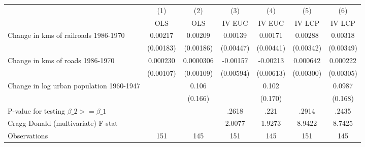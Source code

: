 {
\def\sym#1{\ifmmode^{#1}\else\(^{#1}\)\fi}
\begin{tabular}{l*{6}{c}}
\hline\hline
                &\multicolumn{1}{c}{(1)}&\multicolumn{1}{c}{(2)}&\multicolumn{1}{c}{(3)}&\multicolumn{1}{c}{(4)}&\multicolumn{1}{c}{(5)}&\multicolumn{1}{c}{(6)}\\
                &\multicolumn{1}{c}{OLS}&\multicolumn{1}{c}{OLS}&\multicolumn{1}{c}{IV EUC}&\multicolumn{1}{c}{IV EUC}&\multicolumn{1}{c}{IV LCP}&\multicolumn{1}{c}{IV LCP}\\
\hline
Change in kms of railroads 1986-1970&  0.00217         &  0.00209         &  0.00139         &  0.00171         &  0.00288         &  0.00318         \\
                &(0.00183)         &(0.00186)         &(0.00447)         &(0.00441)         &(0.00342)         &(0.00349)         \\
[1em]
Change in kms of roads 1986-1970& 0.000230         &0.0000306         & -0.00157         & -0.00213         & 0.000642         & 0.000222         \\
                &(0.00107)         &(0.00109)         &(0.00594)         &(0.00613)         &(0.00300)         &(0.00305)         \\
[1em]
Change in log urban population 1960-1947&                  &    0.106         &                  &    0.102         &                  &   0.0987         \\
                &                  &  (0.166)         &                  &  (0.170)         &                  &  (0.168)         \\
\hline
P-value for testing $\beta\_{2} >= \beta\_{1}$&                  &                  &    .2618         &     .221         &    .2914         &    .2435         \\
Cragg-Donald (multivariate) F-stat&                  &                  &   2.0077         &   1.9273         &   8.9422         &   8.7425         \\
Observations    &      151         &      145         &      151         &      145         &      151         &      145         \\
\hline\hline
\end{tabular}
}
